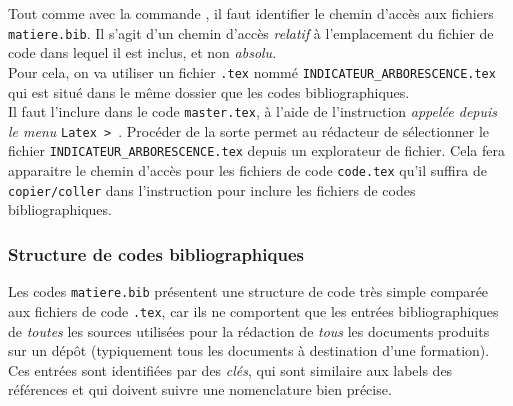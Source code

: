 \documentclass[a4paper, 11pt, twoside, fleqn]{memoir}
\begin{document}
Tout comme avec la commande \texttt{}, il faut identifier le chemin d'accès aux fichiers \texttt{matiere.bib}. Il s'agit d'un chemin d'accès \emph{relatif} à l'emplacement du fichier de code dans lequel il est inclus, et non \emph{absolu}.\\
Pour cela, on va utiliser un fichier \texttt{.tex} nommé \texttt{INDICATEUR\_{}ARBORESCENCE.tex} qui est situé dans le même dossier que les codes bibliographiques.\\
Il faut l'inclure dans le code \texttt{master.tex}, à l'aide de l'instruction \texttt{} \emph{appelée depuis le menu} \texttt{Latex > }. Procéder de la sorte permet au rédacteur de sélectionner le fichier \texttt{INDICATEUR\_{}ARBORESCENCE.tex} depuis un explorateur de fichier. Cela fera apparaitre le chemin d'accès pour les fichiers de code \texttt{code.tex} qu'il suffira de \texttt{copier/coller} dans l'instruction \texttt{} pour inclure les fichiers de codes bibliographiques.\\

			\subsubsection{Structure de codes bibliographiques }

Les codes \texttt{matiere.bib} présentent une structure de code très simple comparée aux fichiers de code \texttt{.tex}, car ils ne comportent que les entrées bibliographiques de \emph{toutes} les sources utilisées pour la rédaction de \emph{tous} les documents produits sur un dépôt (typiquement tous les documents à destination d'une formation). Ces entrées sont identifiées par des \emph{clés}, qui sont similaire aux labels des références et qui doivent suivre une nomenclature bien précise.\\
\end{document}
